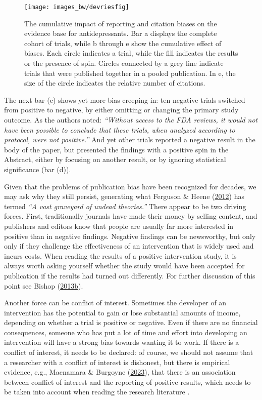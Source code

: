 \documentclass{krantz}
\begin{document}
\begin{figure}
\texttt{[image: images\_bw/devriesfig]} \caption{The cumulative impact of reporting and citation biases on the evidence base for antidepressants. Bar a displays the complete cohort of trials, while b through e show the cumulative effect of biases. Each circle indicates a trial, while the fill indicates the results or the presence of spin. Circles connected by a grey line indicate trials that were published together in a pooled publication. In e, the size of the circle indicates the relative number of citations.}\label{fig:devriesfig}
\end{figure}

The next bar (c) shows yet more bias creeping in: ten negative trials switched from positive to negative, by either omitting or changing the primary study outcome. As the authors noted: \emph{``Without access to the FDA reviews, it would not have been possible to conclude that these trials, when analyzed according to protocol, were not positive.''} And yet other trials reported a negative result in the body of the paper, but presented the findings with a positive spin in the Abstract, either by focusing on another result, or by ignoring statistical significance (bar (d)).

Given that the problems of publication bias have been recognized for decades, we may ask why they still persist, generating what Ferguson \& Heene (\protect\hyperlink{ref-ferguson2012}{2012}) has termed \emph{``A vast graveyard of undead theories.''} There appear to be two driving forces. First, traditionally journals have made their money by selling content, and publishers and editors know that people are usually far more interested in positive than in negative findings. Negative findings can be newsworthy, but only only if they challenge the effectiveness of an intervention that is widely used and incurs costs. When reading the results of a positive intervention study, it is always worth asking yourself whether the study would have been accepted for publication if the results had turned out differently. For further discussion of this point see Bishop (\protect\hyperlink{ref-bishop2013b}{2013b}).

Another force can be conflict of interest. Sometimes the developer of an intervention has the potential to gain or lose substantial amounts of income, depending on whether a trial is positive or negative. Even if there are no financial consequences, someone who has put a lot of time and effort into developing an intervention will have a strong bias towards wanting it to work. If there is a conflict of interest, it needs to be declared: of course, we should not assume that a researcher with a conflict of interest is dishonest, but there is empirical evidence, e.g., Macnamara \& Burgoyne (\protect\hyperlink{ref-macnamara2023}{2023}), that there is an association between conflict of interest and the reporting of positive results, which needs to be taken into account when reading the research literature .
\end{document}
